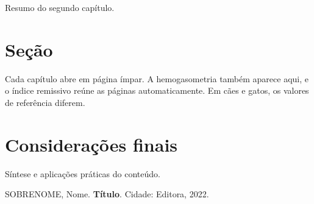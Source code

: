 
\begin{resumo}
Resumo do segundo capítulo.
\end{resumo}

\section{Seção}
Cada capítulo abre em página ímpar. A hemogasometria também aparece aqui, e o índice remissivo reúne as
páginas automaticamente. Em cães e gatos, os valores de referência diferem.

\section{Considerações finais}
Síntese e aplicações práticas do conteúdo.

\begin{referencias}
\item SOBRENOME, Nome. \textbf{Título}. Cidade: Editora, 2022.
\end{referencias}
